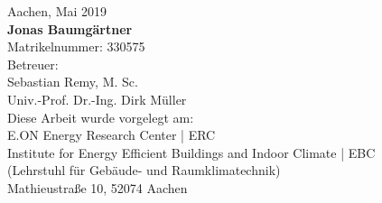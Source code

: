 \begin{titlepage}
\begin{addmargin}[\marginCoverPage]{0cm}
\vfill
\begin{center}
\begingroup
{}\selectfont
Aachen, Mai 2019 \\
\addvspace{0.5cm}
\textbf{Jonas Baumgärtner} \\
Matrikelnummer: 330575 \\
\addvspace{0.5cm}
Betreuer:\\
Sebastian Remy, M. Sc. \\
Univ.-Prof. Dr.-Ing. Dirk Müller \\
\addvspace{0.5cm}
Diese Arbeit wurde vorgelegt am:\\
E.ON Energy Research Center | ERC \\
Institute for Energy Efficient Buildings and Indoor Climate | EBC\\
(Lehrstuhl für Gebäude- und Raumklimatechnik)\\
Mathieustraße 10, 52074 Aachen\\
\endgroup
\end{center}
\end{addmargin}
\end{titlepage}

